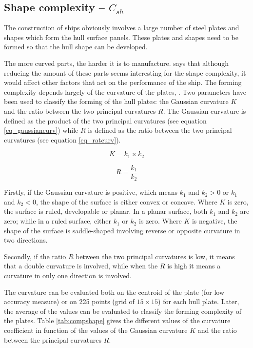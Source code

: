 \subsection{Shape complexity -- $C_{sh}$}
The construction of ships obviously involves a large number of steel plates and shapes which form the hull surface panels. These plates and shapes need to be formed so that the hull shape can be developed.


The more curved parts, the harder it is to manufacture. \cite{nam2012estimation} says that although reducing the amount of these parts seems interesting for the shape complexity, it would affect other factors that act on the performance of the ship. The forming complexity depends largely of the curvature of the plates, \cite{parsons1999scalar}. Two parameters have been used to classify the forming of the hull plates: the Gaussian curvature $K$ and the ratio between the two principal curvatures $R$. The Gaussian curvature is defined as the product of the two principal curvatures (see equation \ref{eq_gaussiancurv}) while $R$ is defined as the ratio between the two principal curvatures (see equation \ref{eq_ratcurv}).
	
\begin{equation}
\label{eq_gaussiancurv}
K = k_1 \times k_2
\end{equation}
	
\begin{equation}
\label{eq_ratcurv}
R = \frac{k_1}{k_2}
\end{equation}
	
Firstly, if the Gaussian curvature is positive, which means $k_1$ and $k_2 > 0$ or $k_1$ and $k_2 < 0$, the shape of the surface is either convex or concave. Where $K$ is zero, the surface is ruled, developable or planar. In a planar surface, both $k_1$ and $k_2$ are zero; while in a ruled surface, either $k_1$ or $k_2$ is zero. Where $K$ is negative, the shape of the surface is saddle-shaped involving reverse or opposite curvature in two directions.


Secondly, if the ratio $R$ between the two principal curvatures is low, it means that a double curvature is involved, while when the $R$ is high it means a curvature in only one direction is involved.


The curvature can be evaluated both on the centroid of the plate (for low accuracy measure) or on 225 points (grid of $15 \times 15$) for each hull plate. Later, the average of the values can be evaluated to classify the forming complexity of the plates. Table \ref{tab:compshape} gives the different values of the curvature coefficient in function of the values of the Gaussian curvature $K$ and the ratio between the principal curvatures $R$.


